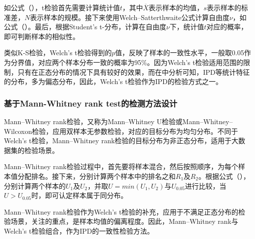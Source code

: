 如公式（），t检验首先需要计算统计值$t$，其中$\overline{X}$表示样本的均值，$s$表示样本的标准差，$N$表示样本的规模。接下来使用Welch–Satterthwaite公式计算自由度$\nu$，如公式（）。最后，根据Student's t-分布，计算在自由度$\nu$下，统计值$t$对应的概率，即可判断样本的相似性。

类似K-S检验，Welch's t检验得到的$p$值，反映了样本的一致性水平，一般取0.05作为分界值，对应两个样本分布一致的概率为95\%。因为Welch’s t检验适用范围的限制，只有在正态分布的情况下具有较好的效果，而在中分析可知，IPD等统计特征的分布，多为偏态分布，因此，Welch's t检验作为IPD的检验方式之一。

\subsubsection{基于Mann-Whitney rank test的检测方法设计}
\label{chap:analyze:statistical:test:mw}

Mann–Whitney rank检验，又称为Mann–Whitney U检验或Mann–Whitney–Wilcoxon检验，应用双样本无参数检验，对应的目标分布为均匀分布。不同于Welch's t检验，Mann–Whitney rank检验的目标分布为非正态分布，适用于大数据集的检验场景。


Mann–Whitney rank检验过程中，首先要将样本混合，然后按照顺序，为每个样本值分配排名。接下来，分别计算两个样本中的排名之和$R_{1}$及$R_{2}$。根据公式（），分别计算两个样本的$U_{1}$及$U_{2}$，并取$U=min(U_{1},U_{2})$与$U_{0.05}$进行比较，当$U>U_{0.05}$时，即可认定样本属于同分布。

Mann–Whitney rank检验作为Welch's t检验的补充，应用于不满足正态分布的检验场景，关注的重点，是样本均值的偏离程度。因此，Mann–Whitney rank与Welch's t检验组合，作为IPD的一致性检验方法。

